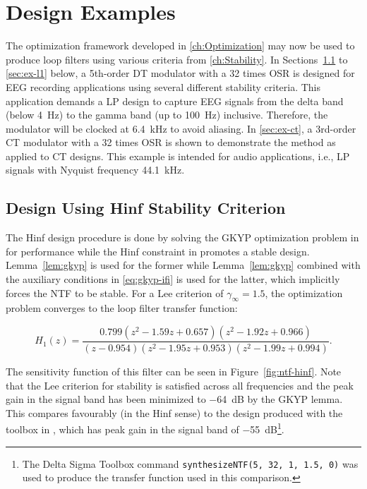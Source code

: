 
\chapter{Design Examples}
\label{ch:Examples}

The optimization framework developed in \autoref{ch:Optimization} may now be used to produce loop filters using various criteria from \autoref{ch:Stability}. In Sections~\ref{sec:ex-hinf} to \ref{sec:ex-l1} below, a 5th-order \gls{DT} modulator with a 32 times \gls{OSR} is designed for \gls{EEG} recording applications using several different stability criteria. This application demands a \gls{LP} design to capture \gls{EEG} signals from the delta band (below \SI{4}{\hertz}) to the gamma band (up to \SI{100}{\hertz}) inclusive. Therefore, the modulator will be clocked at \SI{6.4}{\kilo\hertz} to avoid aliasing. In \autoref{sec:ex-ct}, a 3rd-order \gls{CT} modulator with a 32 times \gls{OSR} is shown to demonstrate the method as applied to \gls{CT} designs. This example is intended for audio applications, i.e., \gls{LP} signals with Nyquist frequency \SI{44.1}{\kilo\hertz}.

\section{Design Using \gls{Hinf} Stability Criterion}
\label{sec:ex-hinf}

The \gls{Hinf} design procedure is done by solving the \gls{GKYP} optimization problem in for performance while the \gls{Hinf} constraint in promotes a stable design. Lemma~\ref{lem:gkyp} is used for the former while Lemma~\ref{lem:gkyp} combined with the auxiliary conditions in \autoref{eq:gkyp-ifi} is used for the latter, which implicitly forces the \gls{NTF} to be stable. For a Lee criterion of $\gamma_\infty = 1.5$, the optimization problem converges to the loop filter transfer function:

\begin{equation*}
	H_1(z) = \frac{0.799\left(z^2 - 1.59z + 0.657\right)\left(z^2 - 1.92z + 0.966\right)}{\left(z - 0.954\right)\left(z^2 - 1.95z + 0.953\right)\left(z^2 - 1.99z + 0.994\right)}.
\end{equation*}

The sensitivity function of this filter can be seen in Figure~\ref{fig:ntf-hinf}. Note that the Lee criterion for stability is satisfied across all frequencies and the peak gain in the signal band has been minimized to \SI{-64}{\deci\bel} by the \gls{GKYP} lemma. This compares favourably (in the \gls{Hinf} sense) to the design produced with the toolbox in \cite[Appx. B]{Schreier1997}, which has peak gain in the signal band of \SI{-55}{\deci\bel}\footnote{The Delta Sigma Toolbox command \texttt{synthesizeNTF(5,~32,~1,~1.5,~0)} was used to produce the transfer function used in this comparison.}.

